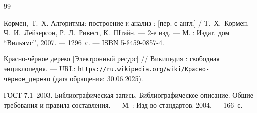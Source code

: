 \begin{thebibliography}{99}

Кормен,~Т.~Х. Алгоритмы: построение и анализ : [пер. с англ.] / Т.~Х.~Кормен, Ч.~И.~Лейзерсон, Р.~Л.~Ривест, К.~Штайн. --- 2-е изд. --- М. : Издат. дом \enquote{Вильямс}, 2007. --- 1296~с. --- ISBN 5-8459-0857-4.

Красно-чёрное дерево [Электронный ресурс] // Википедия : свободная энциклопедия. --- URL: \texttt{https://ru.wikipedia.org/wiki/Красно-чёрное\_дерево} (дата обращения: 30.06.2025).

ГОСТ 7.1–2003. Библиографическая запись. Библиографическое описание. Общие требования и правила составления. --- М. : Изд-во стандартов, 2004. --- 166~с.

\end{thebibliography}
\pagebreak